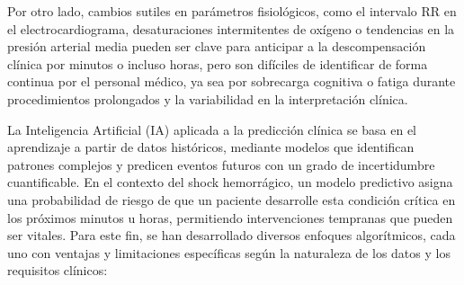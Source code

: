 \documentclass[12pt, letterpaper]{article}
\begin{document}
Por otro lado, cambios sutiles en parámetros fisiológicos, como el intervalo RR en el electrocardiograma, desaturaciones intermitentes de oxígeno o tendencias en la presión arterial media pueden ser clave para anticipar a la descompensación clínica por minutos o incluso horas, pero son difíciles de identificar de forma continua por el personal médico, ya sea por sobrecarga cognitiva o fatiga durante procedimientos prolongados y la variabilidad en la interpretación clínica.

La Inteligencia Artificial (IA) aplicada a la predicción clínica se basa en el aprendizaje a partir de datos históricos, mediante modelos que identifican patrones complejos y predicen eventos futuros con un grado de incertidumbre cuantificable. En el contexto del shock hemorrágico, un modelo predictivo asigna una probabilidad de riesgo de que un paciente desarrolle esta condición crítica en los próximos minutos u horas, permitiendo intervenciones tempranas que pueden ser vitales. Para este fin, se han desarrollado diversos enfoques algorítmicos, cada uno con ventajas y limitaciones específicas según la naturaleza de los datos y los requisitos clínicos:
\end{document}
